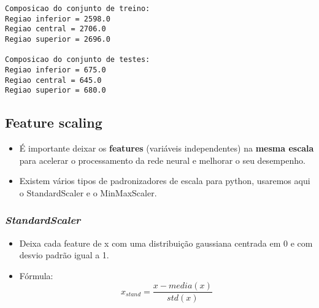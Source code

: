 \documentclass[11pt]{article}
\providecommand{\tightlist}{%
      \setlength{\itemsep}{0pt}\setlength{\parskip}{0pt}}
\begin{document}
    \begin{Verbatim}[commandchars=\\\{\}]
Composicao do conjunto de treino:
Regiao inferior = 2598.0
Regiao central = 2706.0
Regiao superior = 2696.0

Composicao do conjunto de testes:
Regiao inferior = 675.0
Regiao central = 645.0
Regiao superior = 680.0

    \end{Verbatim}

    \hypertarget{feature-scaling}{%
\subsection{Feature scaling}\label{feature-scaling}}

\begin{itemize}
\tightlist
\item
  É importante deixar os \textbf{features} (variáveis independentes) na
  \textbf{mesma escala} para acelerar o processamento da rede neural e
  melhorar o seu desempenho.
\item
  Existem vários tipos de padronizadores de escala para python, usaremos
  aqui o StandardScaler e o MinMaxScaler.
\end{itemize}

    \hypertarget{standardscaler}{%
\subsubsection{\texorpdfstring{\emph{StandardScaler}}{StandardScaler}}\label{standardscaler}}

\begin{itemize}
\tightlist
\item
  Deixa cada feature de x com uma distribuição gaussiana centrada em 0 e
  com desvio padrão igual a 1.
\item
  Fórmula: \begin{equation}
        x_{stand} = \frac{x - media(x)}{std(x)}
    \end{equation}
\end{itemize}
\end{document}
